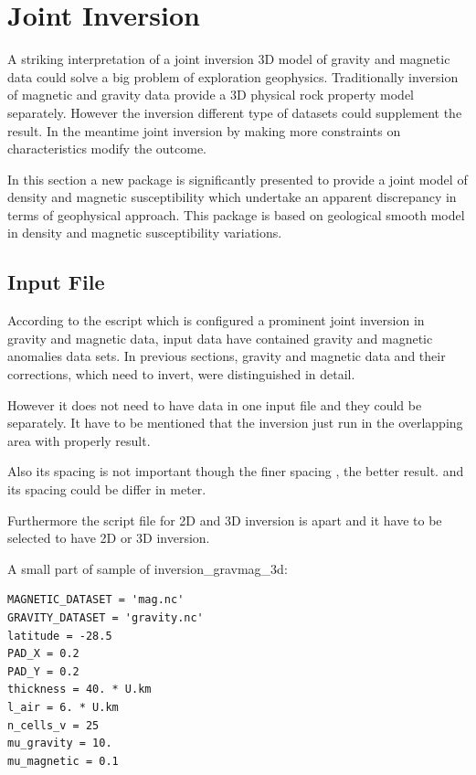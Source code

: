 \chapter{Joint Inversion}\label{Chp:cook:joint inversion}


A striking interpretation of a joint inversion 3D model of gravity and magnetic data could solve a big problem of exploration geophysics. Traditionally inversion of magnetic and gravity data provide a 3D physical rock property model separately. However the inversion different type of datasets could supplement the result. In the meantime joint inversion by making more constraints on characteristics modify the outcome.

In this section a new package is significantly presented to provide a joint model of density and magnetic susceptibility which undertake an apparent discrepancy in terms of geophysical approach. This package is based on geological smooth model in density and magnetic susceptibility variations.



\section{Input File} 

According to the escript which is configured a prominent joint inversion in gravity and magnetic data, input data have contained gravity and magnetic anomalies data sets. In previous sections, gravity and magnetic data and their corrections, which need to invert, were distinguished in detail.

However it does not need to have data in one input file and they could be separately. It have to be mentioned that the inversion just run in the overlapping area with properly result.

Also its spacing is not important though the finer spacing , the better result. and its spacing could be differ in meter. 

Furthermore the script file for 2D and 3D inversion is apart and it have to be selected to have 2D or 3D inversion.

A small part of sample of inversion_gravmag_3d:

\begin{verbatim}
MAGNETIC_DATASET = 'mag.nc'
GRAVITY_DATASET = 'gravity.nc'
latitude = -28.5
PAD_X = 0.2
PAD_Y = 0.2
thickness = 40. * U.km
l_air = 6. * U.km
n_cells_v = 25
mu_gravity = 10.
mu_magnetic = 0.1
\end{verbatim}

